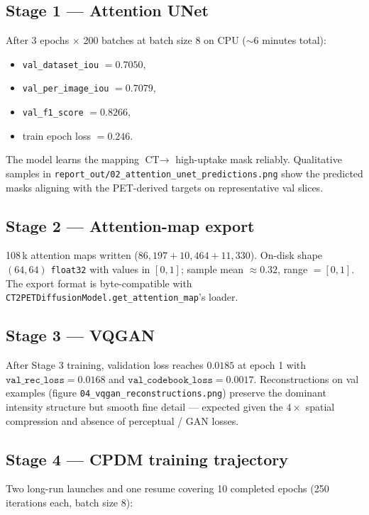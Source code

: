 \documentclass[11pt,a4paper]{article}
\begin{document}
\subsection{Stage 1 --- Attention UNet}

After 3 epochs $\times$ 200 batches at batch size 8 on CPU (${\sim}6$ minutes total):
\begin{itemize}
  \item \texttt{val\_dataset\_iou} $= \mathbf{0.7050}$,
  \item \texttt{val\_per\_image\_iou} $= 0.7079$,
  \item \texttt{val\_f1\_score} $= \mathbf{0.8266}$,
  \item train epoch loss $= 0.246$.
\end{itemize}
The model learns the mapping $\text{CT} \to$ high-uptake mask reliably. Qualitative samples in \texttt{report\_out/02\_attention\_unet\_predictions.png} show the predicted masks aligning with the PET-derived targets on representative val slices.

\subsection{Stage 2 --- Attention-map export}

108\,k attention maps written ($86{,}197 + 10{,}464 + 11{,}330$). On-disk shape $(64, 64)$ \texttt{float32} with values in $[0, 1]$; sample mean $\approx 0.32$, range $= [0, 1]$. The export format is byte-compatible with \texttt{CT2PETDiffusionModel.get\_attention\_map}'s loader.

\subsection{Stage 3 --- VQGAN}

After Stage 3 training, validation loss reaches $0.0185$ at epoch 1 with $\texttt{val\_rec\_loss} = 0.0168$ and $\texttt{val\_codebook\_loss} = 0.0017$. Reconstructions on val examples (figure \texttt{04\_vqgan\_reconstructions.png}) preserve the dominant intensity structure but smooth fine detail --- expected given the $4\times$ spatial compression and absence of perceptual / GAN losses.

\subsection{Stage 4 --- CPDM training trajectory}

Two long-run launches and one resume covering 10 completed epochs (250 iterations each, batch size 8):
\end{document}
